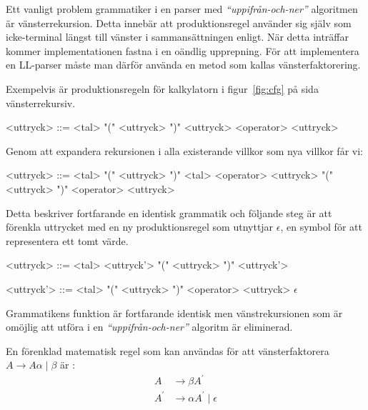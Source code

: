 Ett vanligt problem grammatiker i en parser med \textit{``uppifrån-och-ner''}
algoritmen är vänsterrekursion. Detta innebär att produktionsregel använder
sig själv som icke-terminal längst till vänster i sammansättningen enligt. När
detta inträffar kommer implementationen fastna i en oändlig upprepning. För
att implementera en LL-parser måste man därför använda en metod som kallas
vänsterfaktorering.

Exempelvis är produktionsregeln för kalkylatorn i figur~\ref{fig:cfg} på sida
\pageref{fig:cfg} vänsterrekursiv.

\setlength{\grammarindent}{5em}
\begin{grammar}
  \singlespace\small%
  \selectfont
  <uttryck> ::= <tal>
    \alt "(" <uttryck> ")"
    \alt <uttryck> <operator> <uttryck>
\end{grammar}

Genom att expandera rekursionen i alla existerande villkor som nya villkor får
vi:

\setlength{\grammarindent}{5em}
\begin{grammar}
  \singlespace\small%
  \selectfont
  <uttryck> ::= <tal>
    \alt "(" <uttryck> ")"
    \alt <tal> <operator> <uttryck>
    \alt "(" <uttryck> ")" <operator> <uttryck>
\end{grammar}

Detta beskriver fortfarande en identisk grammatik och följande steg är att
förenkla uttrycket med en ny produktionsregel som utnyttjar $\epsilon$, en
symbol för att representera ett tomt värde.

\setlength{\grammarindent}{5em}
\begin{grammar}
  \singlespace\small%
  \selectfont
  <uttryck> ::= <tal> <uttryck'>
    \alt "(" <uttryck> ")" <uttryck'>

  <uttryck'> ::= <tal>
    \alt "(" <uttryck> ")"
    \alt <operator> <uttryck>
    \alt $\epsilon$
\end{grammar}

Grammatikens funktion är fortfarande identisk men vänstrekursionen som är
omöjlig att utföra i en \textit{``uppifrån-och-ner''} algoritm är eliminerad.

En förenklad matematisk regel som kan användas för att vänsterfaktorera
$A \rightarrow A\alpha\;|\;\beta$ är \citep[s. 212]{aa06}:
\begin{align*}
A &\rightarrow \beta A^\prime \\
A^\prime &\rightarrow \alpha A^\prime\;|\;\epsilon
\end{align*}

